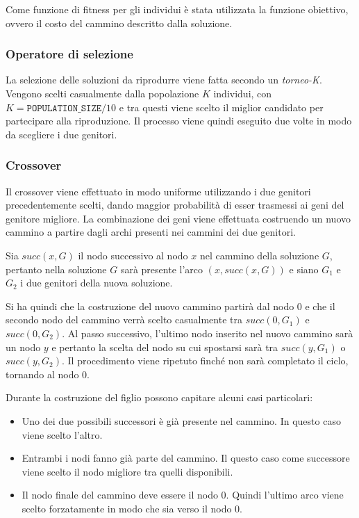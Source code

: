 Come funzione di fitness per gli individui è stata utilizzata la funzione obiettivo, ovvero il costo del cammino descritto dalla soluzione.

\subsubsection{Operatore di selezione}

La selezione delle soluzioni da riprodurre viene fatta secondo un \textit{torneo-K}. Vengono scelti casualmente dalla popolazione $K$ individui, con $K = \texttt{POPULATION\_SIZE}/10$ e tra questi viene scelto il miglior candidato per partecipare alla riproduzione.
Il processo viene quindi eseguito due volte in modo da scegliere i due genitori.

\subsubsection{Crossover}

Il crossover viene effettuato in modo uniforme utilizzando i due genitori precedentemente scelti, dando maggior probabilità di esser trasmessi ai geni del genitore migliore.
La combinazione dei geni viene effettuata costruendo un nuovo cammino a partire dagli archi presenti nei cammini dei due genitori.

Sia $succ(x, G)$ il nodo successivo al nodo $x$ nel cammino della soluzione $G$, pertanto nella soluzione $G$ sarà presente l'arco $(x, succ(x,G))$ e siano $G_1$ e $G_2$ i due genitori della nuova soluzione.

Si ha quindi che la costruzione del nuovo cammino partirà dal nodo 0 e che il secondo nodo del cammino verrà scelto casualmente tra $succ(0,G_1)$ e $succ(0,G_2)$.
Al passo successivo, l'ultimo nodo inserito nel nuovo cammino sarà un nodo $y$ e pertanto la scelta del nodo su cui spostarsi sarà tra $succ(y,G_1)$ o $succ(y, G_2)$.
Il procedimento viene ripetuto finché non sarà completato il ciclo, tornando al nodo 0.

Durante la costruzione del figlio possono capitare alcuni casi particolari:

\begin{itemize}
	\item Uno dei due possibili successori è già presente nel cammino. In questo caso viene scelto l'altro.
	\item Entrambi i nodi fanno già parte del cammino. Il questo caso come successore viene scelto il nodo migliore tra quelli disponibili.
	\item Il nodo finale del cammino deve essere il nodo 0. Quindi l'ultimo arco viene scelto forzatamente in modo che sia verso il nodo 0.
\end{itemize}

